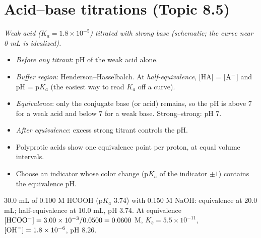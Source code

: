 \documentclass[11pt]{article}
\begin{document}
\section{Acid--base titrations (Topic 8.5)}\label{t:8.5}
\begin{center}

{\small\itshape Weak acid ($K_a = 1.8\times10^{-5}$) titrated with strong base (schematic; the curve near 0 mL is idealized).}
\end{center}
\begin{itemize}
\item \emph{Before any titrant}: pH of the weak acid alone.
\item \emph{Buffer region}: Henderson--Hasselbalch. At \emph{half-equivalence}, [HA] = [$\ce{A-}$] and pH = p$K_a$ (the easiest way to read $K_a$ off a curve).
\item \emph{Equivalence}: only the conjugate base (or acid) remains, so the pH is above 7 for a weak acid and below 7 for a weak base. Strong--strong: pH 7.
\item \emph{After equivalence}: excess strong titrant controls the pH.
\item Polyprotic acids show one equivalence point per proton, at equal volume intervals.
\item Choose an indicator whose color change (p$K_a$ of the indicator $\pm 1$) contains the equivalence pH.
\end{itemize}
 30.0 mL of 0.100 M HCOOH (p$K_a$ 3.74) with 0.150 M NaOH: equivalence at 20.0 mL; half-equivalence at 10.0 mL, pH 3.74. At equivalence $[\ce{HCOO-}] = 3.00\times10^{-3}/0.0500 = 0.0600$ M, $K_b = 5.5\times10^{-11}$, $[\ce{OH-}] = 1.8\times10^{-6}$, pH 8.26.
\end{document}
